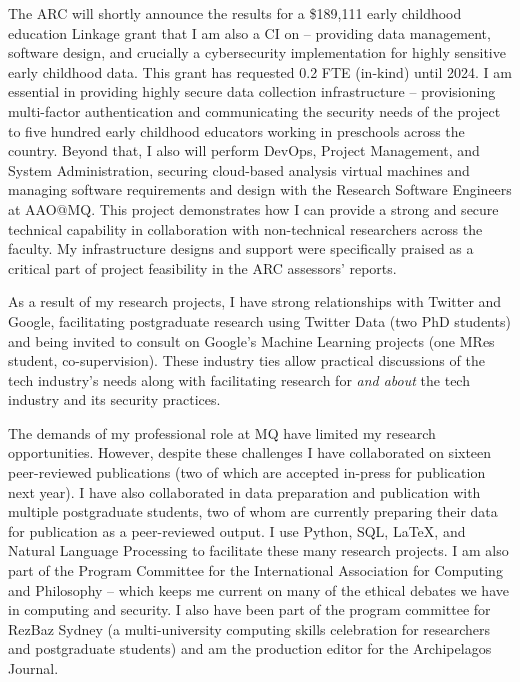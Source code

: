 \documentclass[11pt, a4paper]{awesome-cv}
\begin{document}
\begin{cvletter}
The ARC will shortly announce the results for a \$189,111 early childhood education Linkage grant that I am also a CI on -- providing data management, software design, and crucially a cybersecurity implementation for highly sensitive early childhood data. This grant has requested 0.2 FTE (in-kind) until 2024. I am essential in providing highly secure data collection infrastructure -- provisioning multi-factor authentication and communicating the security needs of the project to five hundred early childhood educators working in preschools across the country. Beyond that, I also will perform DevOps, Project Management, and System Administration, securing cloud-based analysis virtual machines and managing software requirements and design with the Research Software Engineers at AAO@MQ. This project demonstrates how I can provide a strong and secure technical capability in collaboration with non-technical researchers across the faculty. My infrastructure designs and support were specifically praised as a critical part of project feasibility in the ARC assessors' reports.

As a result of my research projects, I have strong relationships with Twitter and Google, facilitating postgraduate research using Twitter Data (two PhD students) and being invited to consult on Google's Machine Learning projects (one MRes student, co-supervision). These industry ties allow practical discussions of the tech industry's needs along with facilitating research for \textit{and about} the tech industry and its security practices. 

The demands of my professional role at MQ have limited my research opportunities. However, despite these challenges I have collaborated on sixteen peer-reviewed publications (two of which are accepted in-press for publication next year). I have also collaborated in data preparation and publication with multiple postgraduate students, two of whom are currently preparing their data for publication as a peer-reviewed output. I use Python, SQL, \LaTeX, and Natural Language Processing to facilitate these many research projects. I am also part of the Program Committee for the International Association for Computing and Philosophy -- which keeps me current on many of the ethical debates we have in computing and security. I also have been part of the program committee for RezBaz Sydney (a multi-university computing skills celebration for researchers and postgraduate students) and am the production editor for the Archipelagos Journal. 



\end{cvletter}
\end{document}
